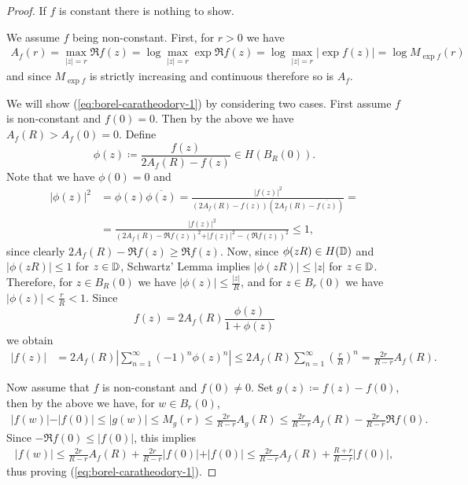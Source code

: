 \begin{proof}
    If $f$ is constant there is nothing to show.

    We assume $f$ being non-constant. First, for $r > 0$ we have
    \begin{align*}
        A_f(r) = \max_{\vert z \vert = r} \Re f(z) = \log \max_{\vert z \vert = r} \exp {\Re f(z)} = \log \max_{\vert z \vert = r} \vert \exp f(z) \vert = \log M_{\exp f}(r)
    \end{align*}
    and since $M_{\exp f}$ is strictly increasing and continuous therefore so is $A_f$.

    We will show (\ref{eq:borel-caratheodory-1}) by considering two cases. First assume $f$ is non-constant and $f(0) = 0$. Then by the above we have $A_f(R) > A_f(0) = 0$. Define
    \begin{equation*}
        \phi(z) \coloneqq \frac{f(z)}{2 A_f(R) - f(z)} \in H(B_R(0)).
    \end{equation*}
    Note that we have $\phi(0) = 0$ and
    \begin{align*}
        \vert \phi(z) \vert^2 &= \phi(z) \overline{\phi(z)} = \frac{\vert f(z) \vert^2}{(2 A_f(R) - f(z))(2 A_f(R) - \overline{f(z)})} = \\
        &= \frac{\vert f(z) \vert^2}{(2 A_f(R) - \Re f(z))^2 + \vert f(z) \vert^2 - (\Re f(z))^2} \leq 1,
    \end{align*}
    since clearly $2 A_f(R) - \Re f(z) \geq \Re f(z)$. Now, since $\phi(zR) \in H(\mathbb{D})$ and $\vert \phi(zR) \vert \leq 1$ for $z \in \mathbb{D}$, Schwartz' Lemma implies $\vert \phi(zR) \vert \leq \vert z \vert$ for $z \in \mathbb{D}$. Therefore, for $z \in B_R(0)$ we have $\vert \phi (z) \vert \leq \frac{\vert z \vert}{R}$, and for $z \in B_r(0)$ we have $\vert \phi (z) \vert < \frac{r}{R} < 1$. Since
    \begin{equation*}
        f(z) = 2 A_f(R) \frac{\phi(z)}{1 + \phi(z)}
    \end{equation*}
    we obtain
    \begin{align*}
        \vert f(z) \vert &= 2 A_f(R) \left\vert \sum_{n=1}^\infty (-1)^n \phi(z)^n \right\vert \leq 2 A_f(R) \sum_{n=1}^\infty \left( \frac{r}{R} \right)^n = \frac{2 r}{R - r} A_f(R).
    \end{align*}

    Now assume that $f$ is non-constant and $f(0) \neq 0$. Set $g(z) \coloneqq f(z) - f(0)$, then by the above we have, for $w \in B_r(0)$,
    \begin{align*}
        \vert f(w) \vert - \vert f(0) \vert \leq \vert g(w) \vert \leq M_g(r) \leq \frac{2 r}{R - r} A_g(R) \leq \frac{2r}{R - r} A_f(R) - \frac{2r}{R - r} \Re f(0).
    \end{align*}
    Since $-\Re f(0) \leq \vert f(0) \vert$, this implies
    \begin{align*}
        \vert f(w) \vert \leq \frac{2r}{R - r}A_f(R) + \frac{2r}{R - r} \vert f(0) \vert + \vert f(0) \vert \leq \frac{2r}{R - r} A_f(R) + \frac{R + r}{R - r} \vert f(0) \vert,
    \end{align*}
    thus proving (\ref{eq:borel-caratheodory-1}).


\end{proof}
